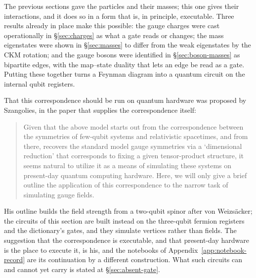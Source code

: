 The previous sections gave the particles and their masses; this one gives their interactions, and it
does so in a form that is, in principle, executable. Three results already in place make this
possible: the gauge charges were cast operationally in \S\ref{sec:charges} as what a gate reads or
changes; the mass eigenstates were shown in \S\ref{sec:masses} to differ from the weak eigenstates by
the CKM rotation; and the gauge bosons were identified in \S\ref{sec:boson-masses} as bipartite
edges, with the map--state duality that lets an edge be read as a gate. Putting these together turns a Feynman diagram into a quantum circuit on the internal qubit registers.

That this correspondence should be run on quantum hardware was proposed by Szangolies, in the
paper that supplies the correspondence itself:
\begin{quotation}
Given that the above model starts out from the correspondence between the symmetries of few-qubit
systems and relativistic spacetimes, and from there, recovers the standard model gauge symmetries
via a `dimensional reduction' that corresponds to fixing a given tensor-product structure, it seems
natural to utilize it as a means of simulating these systems on present-day quantum computing
hardware. Here, we will only give a brief outline the application of this correspondence to the
narrow task of simulating gauge fields.
\hfill \autocite[\S VI]{szangolies2025standardmodel}
\end{quotation}
His outline builds the field strength from a two-qubit spinor after von Weizs\"acker; the circuits
of this section are built instead on the three-qubit fermion registers and the dictionary's gates,
and they simulate vertices rather than fields. The suggestion that the correspondence is
executable, and that present-day hardware is the place to execute it, is his, and the notebooks of
Appendix~\ref{app:notebook-record} are its continuation by a different construction. What such
circuits can and cannot yet carry is stated at \S\ref{sec:absent-gate}.

